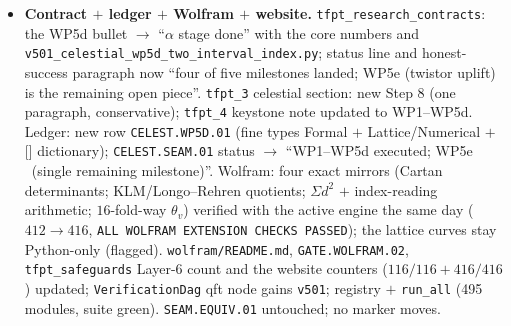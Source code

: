 \begin{itemize}[leftmargin=1.5em]
\item \textbf{Contract $+$ ledger $+$ Wolfram $+$ website.} \texttt{tfpt\_research\_contracts}: the
WP5d bullet $\to$ ``$\alpha$ stage done'' with the core numbers and
\texttt{v501\_celestial\_wp5d\_two\_interval\_index.py}; status line and honest-success paragraph now
``four of five milestones landed; WP5e (twistor uplift) is the remaining open piece''.
\texttt{tfpt\_3} celestial section: new Step 8 (one paragraph, conservative); \texttt{tfpt\_4}
keystone note updated to WP1--WP5d. Ledger: new row \texttt{CELEST.WP5D.01} (fine types Formal $+$
Lattice/Numerical $+$ [\mC] dictionary); \texttt{CELEST.SEAM.01} status $\to$ ``WP1--WP5d executed;
WP5e \mO\ (single remaining milestone)''. Wolfram: four exact mirrors (Cartan determinants;
KLM/Longo--Rehren quotients; $\Sigma d^2$ $+$ index-reading arithmetic; $16$-fold-way $\theta_v$)
verified with the active engine the same day ($412\to416$, \texttt{ALL WOLFRAM EXTENSION CHECKS
PASSED}); the lattice curves stay Python-only (flagged). \texttt{wolfram/README.md},
\texttt{GATE.WOLFRAM.02}, \texttt{tfpt\_safeguards} Layer-6 count and the website counters
($116/116+416/416$) updated; \texttt{VerificationDag} qft node gains \texttt{v501}; registry $+$
\texttt{run\_all} (495 modules, suite green). \texttt{SEAM.EQUIV.01} untouched; no marker moves.
\end{itemize}

